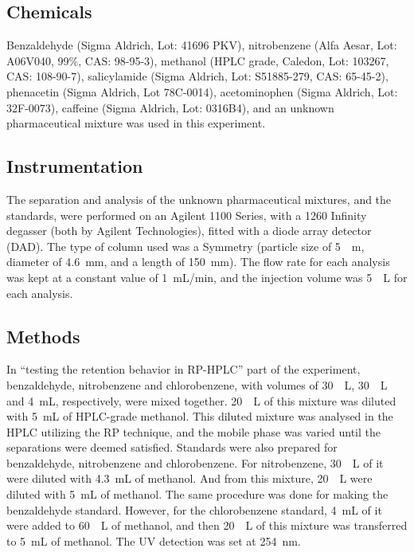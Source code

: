 \documentclass[a4paper, 12pt]{article}
\begin{document}
\subsection{Chemicals}
Benzaldehyde (Sigma Aldrich, Lot: 41696 PKV), nitrobenzene (Alfa Aesar, Lot: A06V040, 99\%, CAS: 98-95-3), methanol (HPLC grade, Caledon, Lot: 103267, CAS: 108-90-7), salicylamide (Sigma Aldrich, Lot: S51885-279, CAS: 65-45-2), phenacetin (Sigma Aldrich, Lot 78C-0014), acetominophen (Sigma Aldrich, Lot: 32F-0073), caffeine (Sigma Aldrich, Lot: 0316B4), and an unknown pharmaceutical mixture was used in this experiment.

\subsection{Instrumentation}
The separation and analysis of the unknown pharmaceutical mixtures, and the standards, were performed on an Agilent 1100 Series, with a 1260 Infinity degasser (both by Agilent Technologies), fitted with a diode array detector (DAD). The type of column used was a Symmetry\textregistered{}  (particle size of \SI{5}{\mu{}m}, diameter of \SI{4.6}{mm}, and a length of \SI{150}{mm}). The flow rate for each analysis was kept at a constant value of \SI{1}{mL/min}, and the injection volume was \SI{5}{\mu{}L} for each analysis.

\subsection{Methods}
In ``testing the retention behavior in RP-HPLC'' part of the experiment, benzaldehyde, nitrobenzene and chlorobenzene, with volumes of \SI{30}{\mu{}L}, \SI{30}{\mu{}L} and \SI{4}{mL}, respectively, were mixed together. \SI{20}{\mu{}L} of this mixture was diluted with \SI{5}{mL} of HPLC-grade methanol. This diluted mixture was analysed in the HPLC utilizing the RP technique, and the mobile phase was varied until the separations were deemed satisfied. Standards were also prepared for benzaldehyde, nitrobenzene and chlorobenzene. For nitrobenzene, \SI{30}{\mu{}L} of it were diluted with \SI{4.3}{mL} of methanol. And from this mixture, \SI{20}{\mu{}L} were diluted with \SI{5}{mL} of methanol. The same procedure was done for making the benzaldehyde standard. However, for the chlorobenzene standard, \SI{4}{mL} of it were added to \SI{60}{\mu{}L} of methanol, and then \SI{20}{\mu{}L} of this mixture was transferred to \SI{5}{mL} of methanol. The UV detection was set at \SI{254}{nm}.
\end{document}
